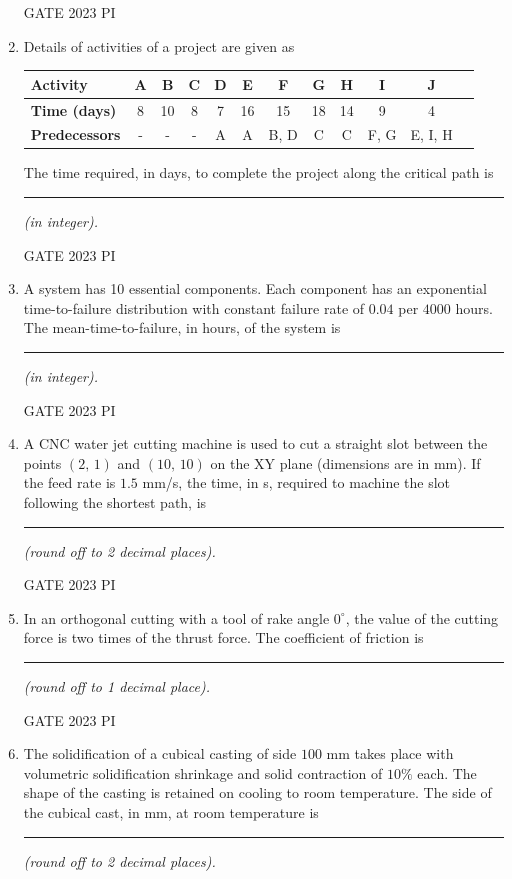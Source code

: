 \documentclass[journal,12pt,onecolumn]{IEEEtran}
\theoremstyle{remark}
\begin{document}
\begin{enumerate}
\hfill{GATE 2023 PI}
\item Details of activities of a project are given as

\begin{center}
\begin{tabular}{|l|c|c|c|c|c|c|c|c|c|c|c|}
\hline
\textbf{Activity} & A & B & C & D & E & F & G & H & I & J \\
\hline
\textbf{Time (days)} & 8 & 10 & 8 & 7 & 16 & 15 & 18 & 14 & 9 & 4 \\
\hline
\textbf{Predecessors} & - & - & - & A & A & B, D & C & C & F, G & E, I, H \\
\hline
\end{tabular}
\end{center}

The time required, in days, to complete the project along the critical path is \rule{3cm}{0.15mm} \textit{(in integer).}

\hfill{GATE 2023 PI}


\item A system has 10 essential components. Each component has an exponential time-to-failure distribution with constant failure rate of $0.04$ per $4000$ hours.
The mean-time-to-failure, in hours, of the system is \rule{3cm}{0.15mm} \textit{(in integer).}

\hfill{GATE 2023 PI}


\item A CNC water jet cutting machine is used to cut a straight slot between the points $(2,\,1)$ and $(10,\,10)$ on the XY plane (dimensions are in mm). If the feed rate is $1.5$ mm/s, the time, in s, required to machine the slot following the shortest path, is \rule{3cm}{0.15mm} \textit{(round off to 2 decimal places).}

\hfill{GATE 2023 PI}


\item In an orthogonal cutting with a tool of rake angle $0^\circ$, the value of the cutting force is two times of the thrust force. The coefficient of friction is \rule{3cm}{0.15mm} \textit{(round off to 1 decimal place).}

\hfill{GATE 2023 PI}
\item The solidification of a cubical casting of side $100$ mm takes place with volumetric solidification shrinkage and solid contraction of $10\%$ each. The shape of the casting is retained on cooling to room temperature. The side of the cubical cast, in mm, at room temperature is \rule{3cm}{0.15mm} \textit{(round off to 2 decimal places).}


\end{enumerate}
\end{document}
